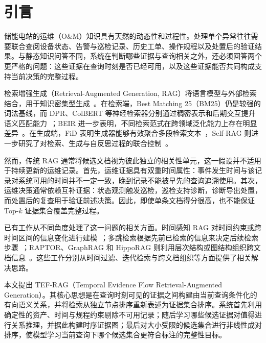 \section{引言}
\label{sec:introduction}

储能电站的运维（O\&M）知识具有天然的动态性和过程性。处理单个异常往往需要联合查阅设备状态、告警与巡检记录、历史工单、操作规程以及处置后的验证结果。与静态知识问答不同，系统在判断哪些证据与查询相关之外，还必须回答两个更严格的问题：这些证据在查询时刻是否已经可用，以及这些证据能否共同构成支持当前决策的完整过程。

检索增强生成（Retrieval-Augmented Generation, RAG）将语言模型与外部检索结合，用于知识密集型生成~\cite{lewis2020rag}。在检索端，Best Matching 25（BM25）仍是较强的词法基线，而 DPR、ColBERT 等神经检索器分别通过稠密表示和后期交互提升语义匹配能力~\cite{karpukhin2020dpr,khattab2020colbert}；BEIR 进一步表明，不同检索范式在跨领域泛化能力上存在明显差异~\cite{thakur2021beir}。在生成端，FiD 表明生成器能够有效聚合多段检索文本~\cite{izacard2021fid}，Self-RAG 则进一步研究了对检索、生成与自反思过程的联合控制~\cite{asai2024selfrag}。

然而，传统 RAG 通常将候选文档视为彼此独立的相关性单元，这一假设并不适用于持续更新的运维记录。首先，运维证据具有双重时间属性：事件发生时间与该记录对系统可用的时间并不一定一致，晚到记录不能被早先的查询追溯使用。其次，运维决策通常依赖互补证据：状态观测触发巡检，巡检支持诊断，诊断导出处置，而处置后的复查用于验证前述决策。因此，即使单条文档得分很高，也不能保证 Top-$k$ 证据集合覆盖完整过程。

已有工作从不同角度处理了这一问题的相关方面。时间感知 RAG 对时间约束或跨时间区间的信息变化进行建模~\cite{zhang2025mrag,lau2025tarag}；多跳检索根据先前已检索的信息来决定后续检索步骤~\cite{xiong2021mdr,trivedi2023ircot}；RAPTOR、GraphRAG 和 HippoRAG 则利用层次结构或图结构组织跨文档信息~\cite{sarthi2024raptor,edge2024graphrag,gutierrez2024hipporag}。这些工作分别从时间过滤、迭代检索与跨文档组织等方面提供了相关解决思路。

本文提出 TEF-RAG（Temporal Evidence Flow Retrieval-Augmented Generation）。其核心思想是在查询时刻可见的证据之间构建由当前查询条件化的有向语义关系，并将检索从独立节点排序重新表述为证据集合排序。系统首先利用确定性的资产、时间与规程约束剔除不可用记录；随后学习哪些候选证据对值得进行关系推理，并据此构建时序证据图；最后对大小受限的候选集合进行非线性成对排序，使模型学习当前查询下哪个候选集合更符合标注的完整性目标。

